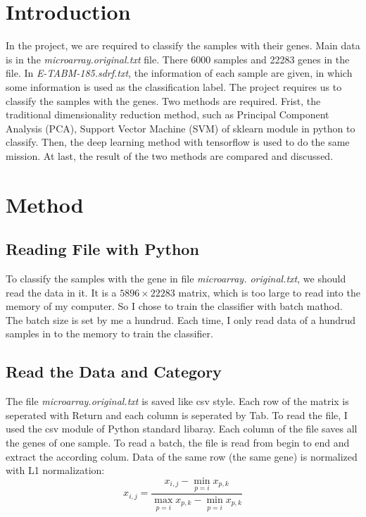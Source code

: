 \documentclass[sigchi]{acmart}
\begin{document}
\section{Introduction}
In the project, we are required to classify the samples with their genes. Main data is in the \textit{ microarray.original.txt} file. There 6000 samples and 22283 genes in the file. In \textit {E-TABM-185.sdrf.txt}, the information of each sample are given, in which some information is used as the classification label. The project requires us to classify the samples with the genes. Two methods are required. Frist, the traditional dimensionality reduction method, such as Principal Component Analysis (PCA), Support Vector Machine (SVM) of sklearn module in python to classify. Then, the deep learning method with tensorflow is used to do the same mission. At last, the result of the two methods are compared and discussed.

\section{Method}
\subsection{Reading File with Python}
To classify the samples with the gene in file  \textit{ microarray. original.txt}, we should read the data in it. It is a $5896\times22283$ matrix, which is too large to read into the memory of my computer. So I chose to train the classifier with batch mathod. The batch size is set by me a hundrud. Each time, I only read data of a hundrud samples in to the memory to train the classifier.

\subsection{Read the Data and Category}

The file \textit{ microarray.original.txt} is saved like csv style. Each row of the matrix is seperated with Return and each column is seperated by Tab. To read the file, I used the csv module of Python standard libaray. Each column of the file saves all the genes of one sample. To read a batch, the file is read from begin to end and extract the according colum. Data of the same row (the same gene) is normalized with L1 normalization:
\begin{equation}
  x_{i, j} = \dfrac{x_{i, j} - \min\limits_{p=i} x_{p, k}}{\max\limits_{p=i} x_{p, k} - \min\limits_{p=i} x_{p, k}}
\end{equation}
\end{document}
